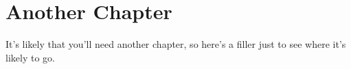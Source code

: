 \chapter{Another Chapter}

It's likely that you'll need another chapter, so here's a filler just to see
where it's likely to go.
